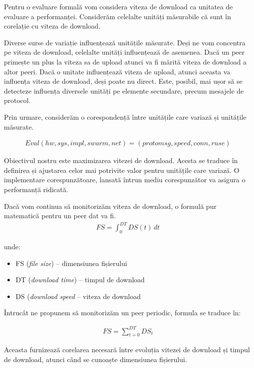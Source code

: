 Pentru o evaluare formală vom considera viteza de download ca unitatea de
evaluare a performanței. Considerăm celelalte unități măsurabile că sunt în
corelație cu viteza de download.

Diverse surse de variație influențează unitățile măsurate. Deși ne vom
concentra pe viteza de download, celelalte unități influențează de asemenea.
Dacă un peer primește un plus la viteza sa de upload atunci va fi mărită
viteza de download a altor peeri. Dacă o unitate influențează viteza de
upload, atunci aceasta va influența viteza de download, deși poate nu direct.
Este, posibil, mai ușor să se detecteze influența diversele unități pe
elemente secundare, precum mesajele de protocol.

Prin urmare, considerăm o corespondență între unitățile care variază și
unitățile măsurate.

\begin{align}
\label{eq:proto-measure:eval}
Eval(hw, sys, impl, swarm, net) = (protomsg, speed, conn, ruse)
\end{align}

Obiectivul nostru este maximizarea vitezei de download. Acesta se traduce în
definirea și ajustarea celor mai potrivite valor pentru unitățile care
variază. O implementare corespunzătoare, lansată întrun mediu corespunzător va
asigura o performanță ridicată.

Dacă vom continua să monitorizăm viteza de download, o formulă pur matematică
pentru un peer dat va fi.
\begin{align}
  FS = \int_0^{DT} DS(t)\,dt
\end{align}

unde:

\begin{itemize}
  \item FS (\textit{file size}) -- dimensiunea fișierului
  \item DT (\textit{download time}) -- timpul de download
  \item DS (\textit{download speed} -- viteza de download
\end{itemize}

Întrucât ne propunem să monitorizăm un peer periodic, formula se traduce în:

\begin{align}
  FS = \sum_{t=0}^{DT} DS_{t}
\end{align}

Aceasta furnizează corelarea necesară între evoluția vitezei de download și
timpul de download, atunci când se cunoaște dimensiunea fișierului.

